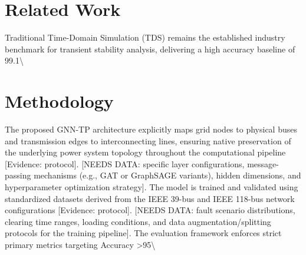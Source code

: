 \documentclass[11pt,a4paper]{article}
\begin{document}
\section{Related Work}
Traditional Time-Domain Simulation (TDS) remains the established industry benchmark for transient stability analysis, delivering a high accuracy baseline of 99.1\textbackslash{}%

\section{Methodology}
The proposed GNN-TP architecture explicitly maps grid nodes to physical buses and transmission edges to interconnecting lines, ensuring native preservation of the underlying power system topology throughout the computational pipeline [Evidence: protocol]. [NEEDS DATA: specific layer configurations, message-passing mechanisms (e.g., GAT or GraphSAGE variants), hidden dimensions, and hyperparameter optimization strategy]. The model is trained and validated using standardized datasets derived from the IEEE 39-bus and IEEE 118-bus network configurations [Evidence: protocol]. [NEEDS DATA: fault scenario distributions, clearing time ranges, loading conditions, and data augmentation/splitting protocols for the training pipeline]. The evaluation framework enforces strict primary metrics targeting Accuracy >95\textbackslash{}%
\end{document}
